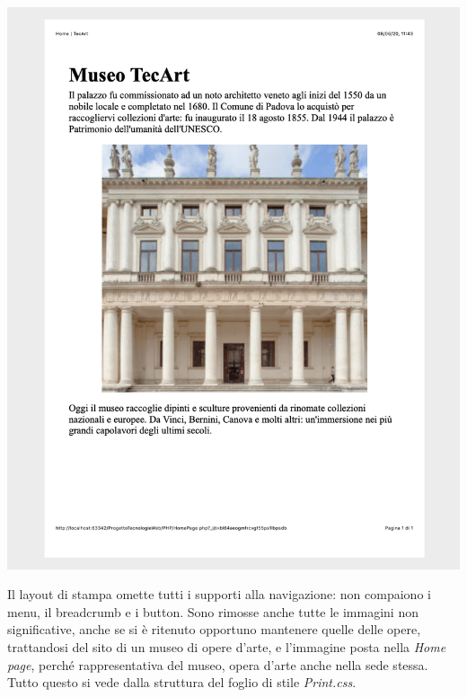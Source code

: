 \begin{center}
	\includegraphics[scale=0.5]{img/Stampa-pres}
\end{center}

Il layout di stampa omette tutti i supporti alla navigazione: non compaiono i menu, il breadcrumb e i button. Sono rimosse anche tutte le immagini non significative, anche se si è ritenuto opportuno mantenere quelle delle opere, trattandosi del sito di un museo di opere d'arte, e l'immagine posta nella \textit{Home page}, perché rappresentativa del museo, opera d'arte anche nella sede stessa. Tutto questo si vede dalla struttura del foglio di stile \textit{Print.css}.
